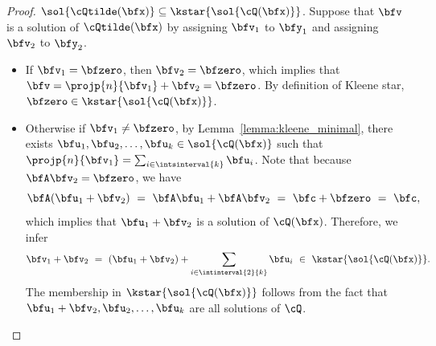 \begin{proof}
    \uline{$\sol{\cQtilde(\bfx)} \subseteq \kstar{\sol{\cQ(\bfx)}}$}.
    Suppose that $\bfv$ is a solution of $\cQtilde(\bfx)$
    by assigning $\bfv_1$  to $\bfy_1$ and assigning $\bfv_2$ to $\bfy_2$.
    \begin{itemize}
        \item
            If $\bfv_1 = \bfzero$, then $\bfv_2 = \bfzero$,
            which implies that
            $\bfv = \projp{n}{\bfv_1} + \bfv_2 = \bfzero$.
            By definition of Kleene star,
            $\bfzero \in \kstar{\sol{\cQ(\bfx)}}$.
        \item
            Otherwise if $\bfv_1 \neq \bfzero$,
            by Lemma~\ref{lemma:kleene_minimal},
            there exists $\bfu_1, \bfu_2, \ldots, \bfu_k \in \sol{\cQ(\bfx)}$ such that
            $\projp{n}{\bfv_1} = \sum_{i \in \intsinterval{k}} \bfu_i$.
            Note that because $\bfA\bfv_2 = \bfzero$, we have
            \begin{equation*}
                \bfA (\bfu_1 + \bfv_2)
                \ =\ \bfA\bfu_1 + \bfA\bfv_2
                \ =\ \bfc + \bfzero
                \ =\ \bfc,
            \end{equation*}
            which implies that $\bfu_1 + \bfv_2$ is a solution of $\cQ(\bfx)$.
            Therefore, we infer
            \begin{equation*}
                \bfv_1 + \bfv_2
                \ =\ (\bfu_1 + \bfv_2) + \sum_{i \in \intinterval{2}{k}} \bfu_i
                \ \in\ \kstar{\sol{\cQ(\bfx)}}.
            \end{equation*}
            The membership in $\kstar{\sol{\cQ(\bfx)}}$
            follows from the fact that $\bfu_1 + \bfv_2,\bfu_2,\ldots,\bfu_k$ are all solutions of $\cQ$.
    \end{itemize}
\end{proof}
